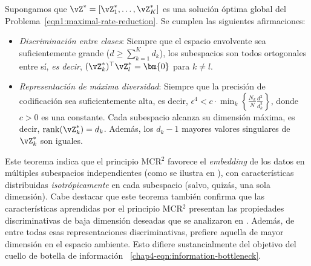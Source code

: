 \documentclass[../../book-main.tex]{subfiles}
\begin{document}
\begin{theorem}
    Supongamos que $\vZ^{\ast} = [\vZ_1^*,\dots,\vZ_K^*]$ es una solución óptima global
    del Problema~\eqref{eqn1:maximal-rate-reduction}. Se cumplen
    las siguientes afirmaciones:
    \begin{itemize}
        \item {\em Discriminación entre clases}: Siempre que el
            espacio envolvente sea suficientemente grande ($d \ge \sum_{k=1}^{K} d_k$), los
            subespacios son todos ortogonales entre sí, {\em es decir},
            $(\vZ_{k}^*)^{\top} \vZ_{l}^* = \bm{0}$ para $k \neq l$.
        \item {\em Representación de máxima diversidad}:
            Siempre que la precisión de codificación sea suficientemente alta, es decir,
            $\epsilon ^4 < c\cdot \min_{k}\left\{
            \frac{N_k}{N}\frac{d^2}{d_k^2}\right\}$, donde $c>0$ es una
            constante. Cada subespacio alcanza su dimensión máxima, es decir,
            $\mathrm{rank}{(\vZ_{k}^*)}= d_k$. Además, los
            $d_k-1$ mayores valores singulares de $\vZ_{k}^*$ son iguales.
            \label{thm:MCR2-properties}
    \end{itemize}
\end{theorem}

Este teorema indica que el principio MCR$^2$ favorece el \textit{embedding}
de los datos en múltiples subespacios independientes (como se ilustra en
), con características distribuidas {\em isotrópicamente}
en cada subespacio (salvo, quizás, una sola dimensión). Cabe destacar que este
teorema también confirma que las características aprendidas por el principio MCR$^2$
presentan las propiedades discriminativas de baja dimensión deseadas
que se analizaron en . Además, de entre todas
esas representaciones discriminativas, prefiere aquella de mayor
dimensión en el espacio ambiente. Esto difiere sustancialmente
del objetivo del cuello de botella de información
~\eqref{chap4-eqn:information-bottleneck}.
\end{document}
